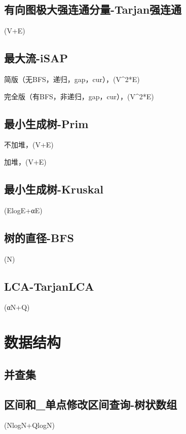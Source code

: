 \documentclass[10pt]{article}
\begin{document}
\subsection{有向图极大强连通分量-Tarjan强连通}
(V+E)


\subsection{最大流-iSAP}
简版（无BFS，递归，gap，cur），(V^2*E)

完全版（有BFS，非递归，gap，cur），(V^2*E)


\subsection{最小生成树-Prim}
不加堆，(V+E)

加堆，(V+E)


\subsection{最小生成树-Kruskal}
(ElogE+αE)


\subsection{树的直径-BFS}
(N)


\subsection{LCA-TarjanLCA}
(αN+Q)

\section{数据结构}
\subsection{并查集}


\subsection{区间和_单点修改区间查询-树状数组}
(NlogN+QlogN)

\end{document}
